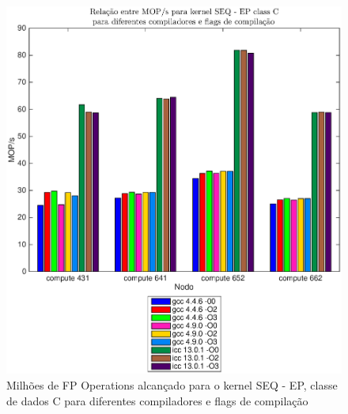 \documentclass[conference,compsoc]{IEEEtran}
\begin{document}
\begin{figure}[H]
\centering
\includegraphics[width=1.1\columnwidth]{EPS/SEQ/MOPS_seq_ep_C.eps}
\caption{Milhões de FP Operations alcançado para o kernel SEQ - EP, classe de dados C para diferentes compiladores e flags de compilação}
\label{mops_seq_ep_c}
\end{figure}
\end{document}
